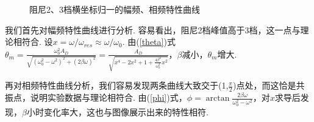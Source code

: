 \documentclass[UTF8]{ctexart}
\begin{document}
\begin{figure}[H]\centering
{
\hspace{-25mm}
\hspace{-15mm}
\caption{阻尼2、3档横坐标归一的幅频、相频特性曲线}
\restoregeometry
}
\end{figure}\par
我们首先对幅频特性曲线进行分析. 容易看出，阻尼2档峰值高于3档，这一点与理论相符合. 设$x=\omega/\omega_{res}\approx\omega/\omega_{0}$. 由(\ref{theta})式$\displaystyle{\theta_m=\frac{\omega_0^2A_D}{\sqrt{(\omega_0^2-\omega^2)^2+(2\beta\omega)^2}}=\frac{A_D}{\sqrt{x^4-2x^2+1+\frac{4\beta^2}{\omega_0^2}x^2}}}$，$\beta$减小，$\theta_m$增大.\par
再对相频特性曲线分析，我们容易发现两条曲线大致交于(1,$\frac{\pi}{2}$)点处，而这恰是共振点，说明实验数据与理论相符合. 由(\ref{phi})式，$\displaystyle{\phi=\arctan\frac{2\beta\omega}{\omega_0^2-\omega^2}}$，对$x$求导后发现，$\beta$小时变化率大，这也与图像展示出来的特性相符.
\end{document}
